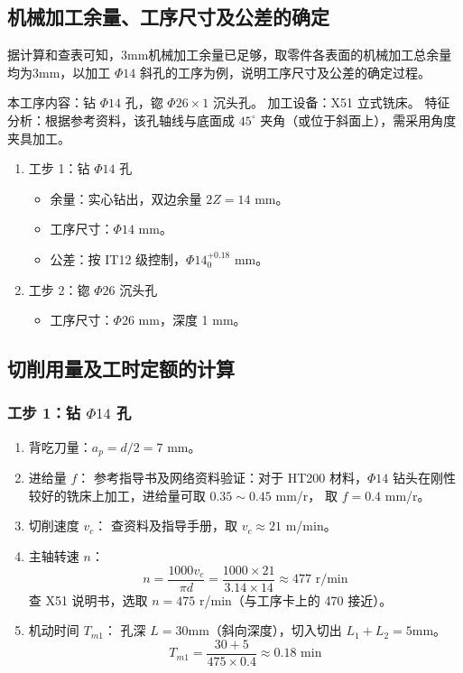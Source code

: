 \documentclass[withoutpreface,bwprint]{cumcmthesis}
\begin{document}
\subsection{机械加工余量、工序尺寸及公差的确定}

据计算和查表可知，3mm机械加工余量已足够，取零件各表面的机械加工总余量均为3mm，以加工 $\Phi14$ 斜孔的工序为例，说明工序尺寸及公差的确定过程。

本工序内容：钻 $\Phi14$ 孔，锪 $\Phi26 \times 1$ 沉头孔。
加工设备：X51 立式铣床。
特征分析：根据参考资料，该孔轴线与底面成 $45^\circ$ 夹角（或位于斜面上），需采用角度夹具加工。

\begin{enumerate}
    \item 工步 1：钻 $\Phi14$ 孔
    \begin{itemize}
        \item 余量：实心钻出，双边余量 $2Z = 14$ mm。
        \item 工序尺寸：$\Phi14$ mm。
        \item 公差：按 IT12 级控制，$\Phi14^{+0.18}_{0}$ mm。
    \end{itemize}
    \item 工步 2：锪 $\Phi26$ 沉头孔
    \begin{itemize}
        \item 工序尺寸：$\Phi26$ mm，深度 1 mm。
    \end{itemize}
\end{enumerate}

\subsection{切削用量及工时定额的计算}

\subsubsection{工步 1：钻 $\Phi14$ 孔}
\begin{enumerate}
    \item 背吃刀量：$a_p = d/2 = 7$ mm。
    \item 进给量 $f$：
    参考指导书及网络资料验证：对于 HT200 材料，$\Phi14$ 钻头在刚性较好的铣床上加工，进给量可取 $0.35 \sim 0.45$ mm/r，
    取 $f = 0.4$ mm/r。
    \item 切削速度 $v_c$：
    查资料及指导手册，取 $v_c \approx 21$ m/min。
    \item 主轴转速 $n$：
    \[ n = \frac{1000 v_c}{\pi d} = \frac{1000 \times 21}{3.14 \times 14} \approx 477 \text{ r/min} \]
    查 X51 说明书，选取 $n = 475$ r/min（与工序卡上的 470 接近）。
    \item 机动时间 $T_{m1}$：
    孔深 $L=30$mm（斜向深度），切入切出 $L_1+L_2=5$mm。
    \[ T_{m1} = \frac{30 + 5}{475 \times 0.4} \approx 0.18 \text{ min} \]
\end{enumerate}
\end{document}
